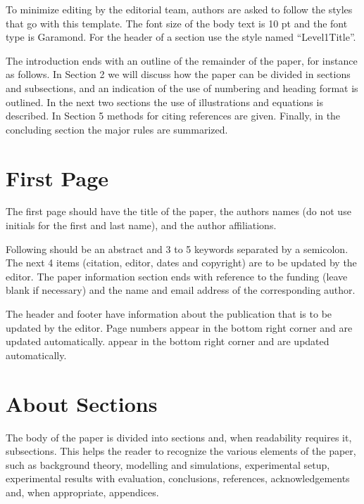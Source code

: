 \documentclass[10pt]{style_src/imeko_acta}
\begin{document}
To minimize editing by the editorial team, authors are asked 
to follow the styles that go with this template. The font size of 
the body text is 10 pt and the font type is Garamond. For the 
header of a section use the style named “Level1Title”.

The introduction ends with an outline of the remainder of the 
paper, for instance as follows. In Section 2 we will discuss how 
the paper can be divided in sections and subsections, and an 
indication of the use of numbering and heading format is 
outlined. In the next two sections the use of illustrations and 
equations is described. In Section 5 methods for citing references 
are given. Finally, in the concluding section the major rules are 
summarized.\vfill\par

\section{First Page}

The first page should have the title of the paper, the authors names (do not use initials for the first and last name), and the author affiliations.

Following should be an abstract and 3 to 5 keywords separated by a semicolon. The next 4 items (citation, editor, dates and copyright) are to be updated by the editor. The paper information section ends with reference to the funding (leave blank if necessary) and the name and email address of the corresponding author. %

The header and footer have information about the publication that is to be updated by the editor. Page numbers appear in the bottom right corner and are updated automatically. appear in the bottom right corner and are updated automatically.

\section{About Sections}

The body of the paper is divided into sections and, when readability requires it, subsections. This helps the reader to recognize the various elements of the paper, such as background theory, modelling and simulations, experimental setup, experimental results with evaluation, conclusions, references, acknowledgements and, when appropriate, appendices. 
\end{document}
